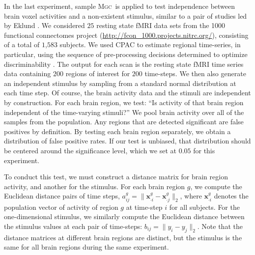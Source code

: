 \documentclass[11pt]{article}
\providecommand{\sct}[1]{{\normalfont\textsc{#1}}}
\providecommand{\mb}[1]{\boldsymbol{#1}}
\newcommand{\Mgc}{\sct{Mgc}}
\begin{document}
In the last experiment, sample \Mgc~is applied to test independence between brain voxel activities and a non-existent stimulus, similar to a pair of studies led by Eklund  \cite{EklundKnutsson2012,Eklund2015}. We considered $25$ resting state fMRI data sets from the 1000 functional connectomes project (\url{http://fcon_1000.projects.nitrc.org/}), consisting of a total of $1$,$583$ subjects.
We used CPAC to estimate regional time-series, in particular, using the sequence of pre-processing decisions determined to optimize discriminability \cite{Wang2016}.  The output for each scan is the resting state fMRI time series data containing $200$ regions of interest for $200$ time-steps.
%
%
%
We then also generate an independent stimulus  by sampling from a standard normal distribution at each time step.  Of course, the brain activity data and the stimuli are independent by construction.
For each brain region, we test: ``Is activity of that  brain region independent of the time-varying stimuli?'' We pool brain activity over all of the samples from the population.
Any regions that are detected significant are false positives by definition.  By testing each brain region separately, we obtain a distribution of false positive rates.  If our test is unbiased, that distribution should be centered around the significance level, which we set at $0.05$ for this experiment.

To conduct this test, we must construct a distance matrix for brain region activity, and another for the stimulus. For each brain region $g$, we compute the Euclidean distance pairs of time steps,  $a_{ij}^g=\|\mb{x}_{\cdot i}^g-\mb{x}_{\cdot j}^g\|_2$,  where $\mb{x}_{\cdot i}^g$ denotes the population vector of activity of region $g$ at time-step $i$ for all subjects.
For the one-dimensional stimulus, we similarly compute the Euclidean distance between the stimulus values at each pair of time-steps: $b_{ij}= \|y_i - y_j\|_2$.
Note that the distance matrices at different brain regions are distinct, but the stimulus is the same for all brain regions during the same experiment.

\end{document}
